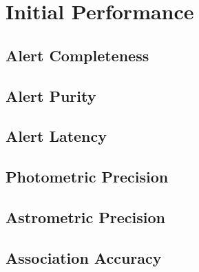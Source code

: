 \section{Initial Performance} \label{sec:performance}


\subsection{Alert Completeness}

\subsection{Alert Purity}

\subsection{Alert Latency}

\subsection{Photometric Precision}

\subsection{Astrometric Precision}

\subsection{Association Accuracy}